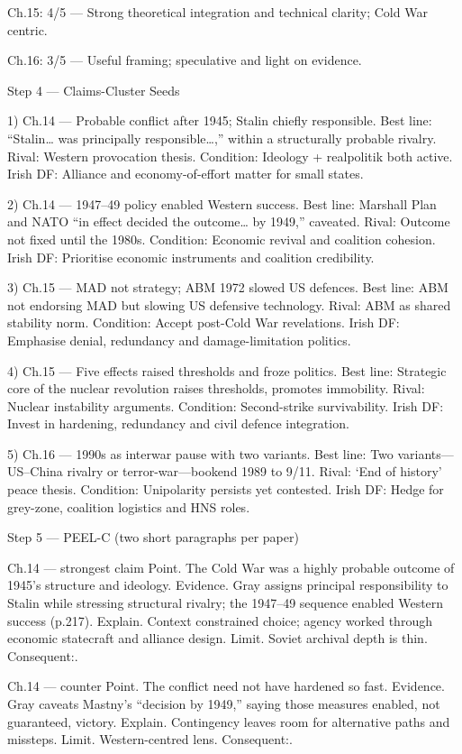Ch.15: 4/5 — Strong theoretical integration and technical clarity; Cold War centric.

Ch.16: 3/5 — Useful framing; speculative and light on evidence.

Step 4 — Claims-Cluster Seeds

1) Ch.14 — Probable conflict after 1945; Stalin chiefly responsible.
Best line: “Stalin… was principally responsible…,” within a structurally probable rivalry.
Rival: Western provocation thesis.
Condition: Ideology + realpolitik both active.
Irish DF: Alliance and economy-of-effort matter for small states.

2) Ch.14 — 1947–49 policy enabled Western success.
Best line: Marshall Plan and NATO “in effect decided the outcome… by 1949,” caveated.
Rival: Outcome not fixed until the 1980s.
Condition: Economic revival and coalition cohesion.
Irish DF: Prioritise economic instruments and coalition credibility.

3) Ch.15 — MAD not strategy; ABM 1972 slowed US defences.
Best line: ABM not endorsing MAD but slowing US defensive technology.
Rival: ABM as shared stability norm.
Condition: Accept post-Cold War revelations.
Irish DF: Emphasise denial, redundancy and damage-limitation politics.

4) Ch.15 — Five effects raised thresholds and froze politics.
Best line: Strategic core of the nuclear revolution raises thresholds, promotes immobility.
Rival: Nuclear instability arguments.
Condition: Second-strike survivability.
Irish DF: Invest in hardening, redundancy and civil defence integration.

5) Ch.16 — 1990s as interwar pause with two variants.
Best line: Two variants—US–China rivalry or terror-war—bookend 1989 to 9/11.
Rival: ‘End of history’ peace thesis.
Condition: Unipolarity persists yet contested.
Irish DF: Hedge for grey-zone, coalition logistics and HNS roles.

Step 5 — PEEL-C (two short paragraphs per paper)

Ch.14 — strongest claim
Point. The Cold War was a highly probable outcome of 1945’s structure and ideology.
Evidence. Gray assigns principal responsibility to Stalin while stressing structural rivalry; the 1947–49 sequence enabled Western success (p.217).
Explain. Context constrained choice; agency worked through economic statecraft and alliance design.
Limit. Soviet archival depth is thin. Consequent:.

Ch.14 — counter
Point. The conflict need not have hardened so fast.
Evidence. Gray caveats Mastny’s “decision by 1949,” saying those measures enabled, not guaranteed, victory.
Explain. Contingency leaves room for alternative paths and missteps.
Limit. Western-centred lens. Consequent:.

